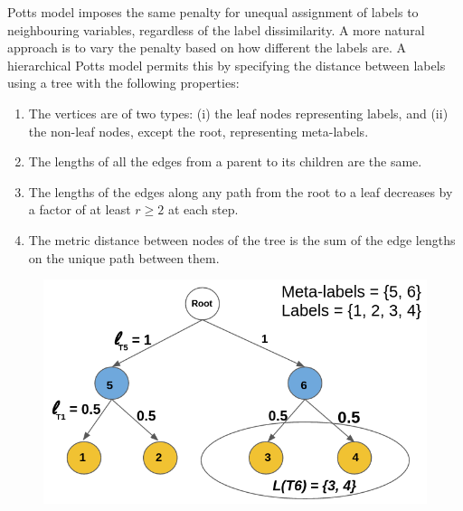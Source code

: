 \label{sec:rhst_worst-case optimal}

Potts model imposes the same penalty for unequal assignment of labels to neighbouring variables, regardless of the label dissimilarity. A more natural approach is to vary the penalty based on how different the labels are. A hierarchical Potts model permits this by specifying the distance between labels using a tree with the following properties:
\vspace{2mm}
\begin{enumerate}
  \itemsep+1em 
\item The vertices are of two types: (i) the leaf nodes representing labels, and (ii) the non-leaf nodes, except the root, representing meta-labels.
\item The lengths of all the edges from a parent to its children are the same.
\item The lengths of the edges along any path from the root to a leaf decreases by a factor of at least $r \geq 2$ at each step.
\item The metric distance between nodes of the tree is the sum of the edge lengths on the unique path between them. 
\end{enumerate}
\vspace{2mm}
%
\begin{figure}
\centering
\includegraphics[scale = 0.30]{./figures/rhst_notation.png}
\label{fig:rhst}
\end{figure}

